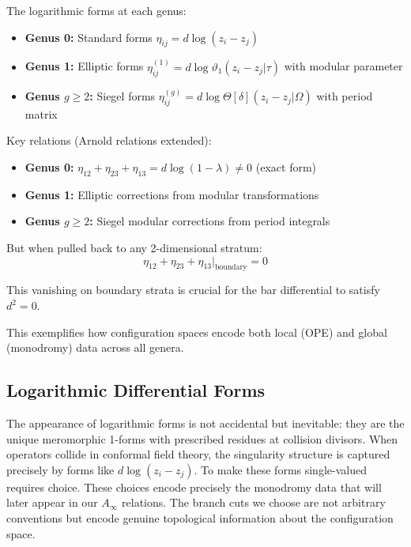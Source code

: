\begin{example}
The logarithmic forms at each genus:
\begin{itemize}
\item \textbf{Genus 0:} Standard forms $\eta_{ij} = d\log(z_i - z_j)$
\item \textbf{Genus 1:} Elliptic forms $\eta_{ij}^{(1)} = d\log\vartheta_1(z_i - z_j|\tau)$ with modular parameter
\item \textbf{Genus $g \geq 2$:} Siegel forms $\eta_{ij}^{(g)} = d\log\Theta[\delta](z_i - z_j|\Omega)$ with period matrix
\end{itemize}

Key relations (Arnold relations extended):
\begin{itemize}
\item \textbf{Genus 0:} $\eta_{12} + \eta_{23} + \eta_{13} = d\log(1-\lambda) \neq 0$ (exact form)
\item \textbf{Genus 1:} Elliptic corrections from modular transformations
\item \textbf{Genus $g \geq 2$:} Siegel modular corrections from period integrals
\end{itemize}

But when pulled back to any 2-dimensional stratum:
$$\eta_{12} + \eta_{23} + \eta_{13}|_{\text{boundary}} = 0$$

This vanishing on boundary strata is crucial for the bar differential to satisfy $d^2 = 0$.

This exemplifies how configuration spaces encode both local (OPE) and global (monodromy) data across all genera.
\end{example}
 
\subsection{Logarithmic Differential Forms}

\begin{remark}
The appearance of logarithmic forms is not accidental but inevitable: they are the unique meromorphic 1-forms with prescribed residues at collision divisors. When operators collide in conformal field theory, the singularity structure is captured precisely by forms like $d\log(z_i - z_j)$. To make these forms single-valued requires choice. These choices encode precisely the monodromy data that will later appear in our $A_\infty$ relations. The branch cuts we choose are not arbitrary conventions but encode genuine topological information about the configuration space.
\end{remark}


